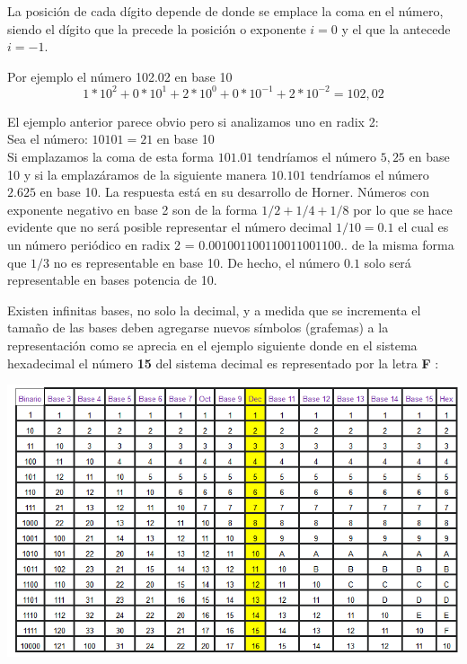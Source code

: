 \documentclass[a4paper,10pt,twocolumn]{article}
\begin{document}
	La posición de cada dígito depende de donde se emplace la coma en el número, siendo el dígito que la precede la posición o exponente $i=0$ y el que la antecede $i=-1$.
	
	Por ejemplo el n\'umero 102.02 en base 10
	\begin{equation}
		1*10^2 + 0*10^1 + 2*10^0 + 0 * 10 ^{-1} + 2 * 10 ^{-2} = 102,02
	\end{equation}
	
	El ejemplo anterior parece obvio pero si analizamos uno en radix 2:\\
	
	Sea el n\'umero: $10101 = 21$ en base 10\\
	
	Si emplazamos la coma de esta forma $101.01$ tendríamos el número $5,25$ en base 10 y si la emplazáramos de la siguiente manera $10.101$ tendríamos el número $2.625$ en base 10. La respuesta está en su desarrollo de Horner. Números con exponente negativo en base 2 son de la forma $1/2+ 1/4 +1/8$ por lo que se hace evidente que no será posible representar el n\'umero decimal $1/10=0.1$ el cual es un n\'umero periódico en radix 2 = $0.001001100110011001100..$ de la misma forma que $1/3$ no es representable en base 10. De hecho, el n\'umero $0.1$ solo será representable en bases potencia de 10.
	
	
	Existen infinitas bases, no solo la decimal, y a medida que se incrementa el tamaño de las bases deben agregarse nuevos símbolos (grafemas) a la representación como se aprecia en el ejemplo siguiente donde en el sistema hexadecimal el número \textbf{15} del sistema decimal es representado por la letra \textbf{F} :
	\begin{center}
		\includegraphics[scale=0.4]{tabla.png}
	\end{center}
	
\end{document}
